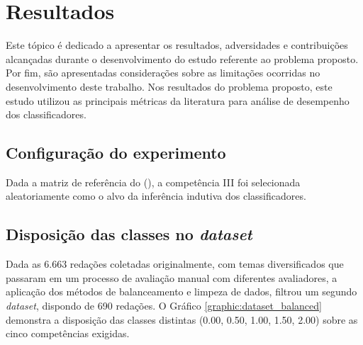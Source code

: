 \section{Resultados}

Este tópico é dedicado a apresentar os resultados, adversidades e contribuições 
alcançadas durante o desenvolvimento do estudo referente ao problema proposto. 
Por fim, são apresentadas considerações sobre as limitações ocorridas no 
desenvolvimento deste trabalho. Nos resultados do problema proposto, este 
estudo utilizou as principais métricas da literatura para análise de desempenho 
dos classificadores.

\subsection{Configuração do experimento}

Dada a matriz de referência do \citeauthor{edital_enem:2016} 
(\citeyear{edital_enem:2016}), a competência III foi selecionada 
aleatoriamente como o alvo da inferência indutiva dos classificadores.

\subsection{Disposição das classes no \textit{dataset}}

Dada as 6.663 redações coletadas originalmente, com temas diversificados que 
passaram em um processo de avaliação manual com diferentes avaliadores, a 
aplicação dos métodos de balanceamento e limpeza de dados, filtrou um segundo 
\textit{dataset}, dispondo de 690 redações. O Gráfico 
\ref{graphic:dataset_balanced} demonstra a disposição das classes distintas 
(0.00, 0.50, 1.00, 1.50, 2.00) sobre as cinco competências exigidas.

